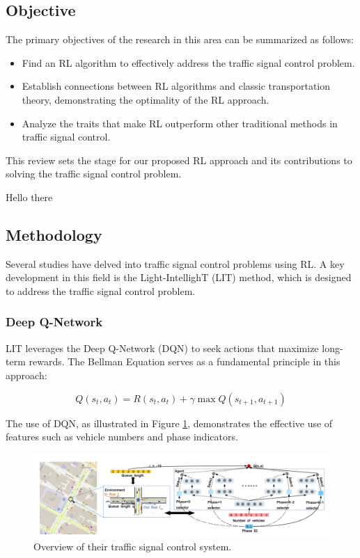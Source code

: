 \subsection{Objective}

The primary objectives of the research in this area can be summarized as follows:

\begin{itemize}
    \item Find an RL algorithm to effectively address the traffic signal control problem.
    \item Establish connections between RL algorithms and classic transportation theory, demonstrating the optimality of the RL approach.
    \item Analyze the traits that make RL outperform other traditional methods in traffic signal control.
\end{itemize}

This review sets the stage for our proposed RL approach and its contributions to solving the traffic signal control problem.


Hello there
\subsection{Methodology}

Several studies have delved into traffic signal control problems using RL. A key development in this field is the Light-IntellighT (LIT) method, which is designed to address the traffic signal control problem.

\subsubsection{Deep Q-Network}

LIT leverages the Deep Q-Network (DQN) to seek actions that maximize long-term rewards. The Bellman Equation \cite{sutton1999between} serves as a fundamental principle in this approach:

\[
Q(s_t, a_t) = R(s_t, a_t) + \gamma \max Q(s_{t+1}, a_{t+1})
\]

The use of DQN, as illustrated in Figure \ref{fig:diagnosis_figure}, demonstrates the effective use of features such as vehicle numbers and phase indicators.

\begin{figure}[h]
    \centering
    \includegraphics[width=1\linewidth]{images/related_work/overview.png}
    \caption{Overview of their traffic signal control system.\cite{zheng2019diagnosing}}
    \label{fig:diagnosis_figure}
\end{figure}

